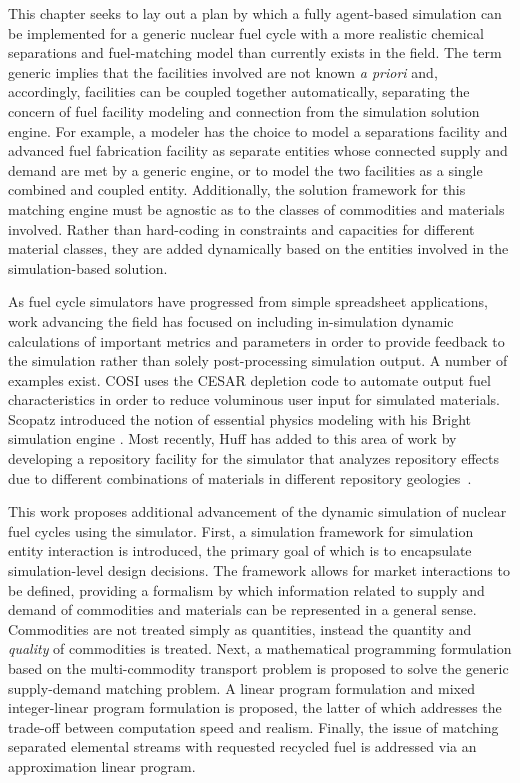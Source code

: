 This chapter seeks to lay out a plan by which a fully agent-based simulation can
be implemented for a generic nuclear fuel cycle with a more realistic chemical
separations and fuel-matching model than currently exists in the field. The term
generic implies that the facilities involved are not known \textit{a priori}
and, accordingly, facilities can be coupled together automatically, separating
the concern of fuel facility modeling and connection from the simulation
solution engine. For example, a modeler has the choice to model a separations
facility and advanced fuel fabrication facility as separate entities whose
connected supply and demand are met by a generic engine, or to model the two
facilities as a single combined and coupled entity. Additionally, the solution
framework for this matching engine must be agnostic as to the classes of
commodities and materials involved. Rather than hard-coding in constraints and
capacities for different material classes, they are added dynamically based on
the entities involved in the simulation-based solution.

As fuel cycle simulators have progressed from simple spreadsheet applications,
work advancing the field has focused on including in-simulation dynamic
calculations of important metrics and parameters in order to provide feedback to
the simulation rather than solely post-processing simulation output. A number of
examples exist. COSI uses the CESAR depletion code \cite{vidal_cesar:_2006} to
automate output fuel characteristics in order to reduce voluminous user input
for simulated materials. Scopatz introduced the notion of essential physics
modeling with his Bright simulation engine \cite{scopatz_essential_2011}. Most
recently, Huff has added to this area of work by developing a repository
facility for the \Cyclus simulator that analyzes repository effects due to
different combinations of materials in different repository
geologies~\cite{huff_integrated_2013}.

This work proposes additional advancement of the dynamic simulation of nuclear
fuel cycles using the \Cyclus simulator. First, a simulation framework for
simulation entity interaction is introduced, the primary goal of which is to
encapsulate simulation-level design decisions. The framework allows for market
interactions to be defined, providing a formalism by which information related
to supply and demand of commodities and materials can be represented in a
general sense. Commodities are not treated simply as quantities, instead the
quantity and \textit{quality} of commodities is treated.  Next, a mathematical
programming formulation based on the multi-commodity transport problem is
proposed to solve the generic supply-demand matching problem. A linear program
formulation and mixed integer-linear program formulation is proposed, the latter
of which addresses the trade-off between computation speed and realism. Finally,
the issue of matching separated elemental streams with requested recycled fuel
is addressed via an approximation linear program.
